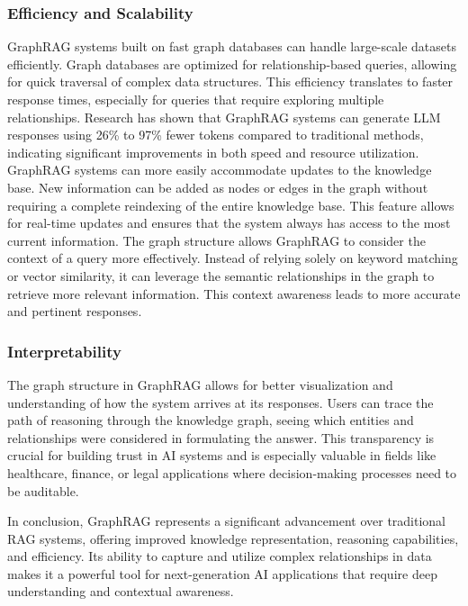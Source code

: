 \documentclass[lettersize,journal]{IEEEtran}
\begin{document}
\subsubsection{Efficiency and Scalability} GraphRAG systems built on fast graph databases can handle large-scale datasets efficiently. Graph databases are optimized for relationship-based queries, allowing for quick traversal of complex data structures. This efficiency translates to faster response times, especially for queries that require exploring multiple relationships. Research has shown that GraphRAG systems can generate LLM responses using 26\% to 97\% fewer tokens compared to traditional methods, indicating significant improvements in both speed and resource utilization.  GraphRAG systems can more easily accommodate updates to the knowledge base. New information can be added as nodes or edges in the graph without requiring a complete reindexing of the entire knowledge base. This feature allows for real-time updates and ensures that the system always has access to the most current information. The graph structure allows GraphRAG to consider the context of a query more effectively. Instead of relying solely on keyword matching or vector similarity, it can leverage the semantic relationships in the graph to retrieve more relevant information. This context awareness leads to more accurate and pertinent responses.
    
\subsubsection{Interpretability} The graph structure in GraphRAG allows for better visualization and understanding of how the system arrives at its responses. Users can trace the path of reasoning through the knowledge graph, seeing which entities and relationships were considered in formulating the answer. This transparency is crucial for building trust in AI systems and is especially valuable in fields like healthcare, finance, or legal applications where decision-making processes need to be auditable.


In conclusion, GraphRAG represents a significant advancement over traditional RAG systems, offering improved knowledge representation, reasoning capabilities, and efficiency. Its ability to capture and utilize complex relationships in data makes it a powerful tool for next-generation AI applications that require deep understanding and contextual awareness.
\end{document}
